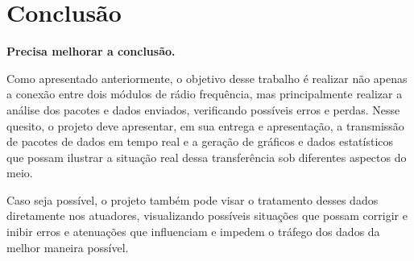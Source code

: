 \documentclass[conference]{IEEEtran}
\begin{document}
\section{Conclus\~ao}

\textbf{Precisa melhorar a conclusão.}

Como apresentado anteriormente, o objetivo desse trabalho \'e realizar n\~ao apenas a conex\~ao entre dois m\'odulos de r\'adio frequ\^encia, mas principalmente realizar a an\'alise dos pacotes e dados enviados, verificando poss\'iveis erros e perdas. Nesse quesito, o projeto deve apresentar, em sua entrega e apresenta\c{c}\~ao, a transmiss\~ao de pacotes de dados em tempo real e a gera\c{c}\~ao de gr\'aficos e dados estat\'isticos que possam ilustrar a situa\c{c}\~ao real dessa transfer\^encia sob diferentes aspectos do meio.

Caso seja poss\'ivel, o projeto tamb\'em pode visar o tratamento desses dados diretamente nos atuadores, visualizando poss\'iveis situa\c{c}\~oes que possam corrigir e inibir erros e atenua\c{c}\~oes que influenciam e impedem o tr\'afego dos dados da melhor maneira poss\'ivel.














\def\refname{Referências}


%






\end{document}

